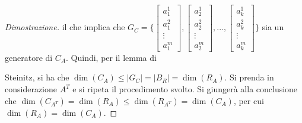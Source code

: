 \begin{proof}[Dimostrazione]
        il che implica che
        $G_C = \{
            \begin{bmatrix}
                a_{1}^{1} \\
                a_{1}^{2} \\
                \vdots \\
                a_{1}^{m}
            \end{bmatrix},
            \begin{bmatrix}
                a_{2}^{1} \\
                a_{2}^{2} \\
                \vdots \\
                a_{2}^{m}
            \end{bmatrix},
            ...,
            \begin{bmatrix}
                a_{k}^{1} \\
                a_{k}^{2} \\
                \vdots \\
                a_{k}^{m}
            \end{bmatrix}
            \}$
        sia un generatore di $C_A$. Quindi, per il lemma di

        \vspace{5pt}
        Steinitz, si ha che $\dim(C_A) \leq |G_C| = |B_R| = \dim(R_A)$. Si prenda in considerazione $A^T$ e si ripeta il procedimento svolto.
        Si giungerà alla conclusione che $\dim(C_{A^T}) = \dim(R_A) \leq \dim(R_{A^T}) = \dim(C_A)$, per cui $\dim(R_A) = \dim(C_A)$.
    \end{proof}

\vspace{10pt}
